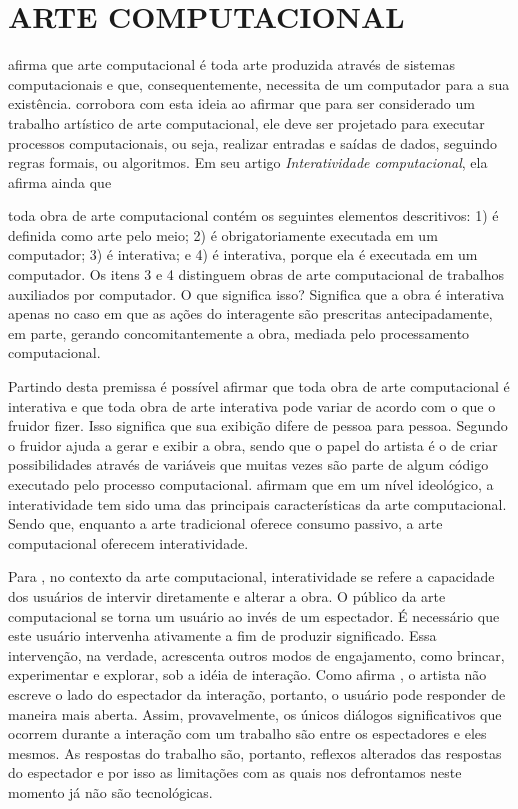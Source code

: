 \section{ARTE COMPUTACIONAL}

 afirma que arte computacional é toda arte produzida através de sistemas  computacionais e que, consequentemente, necessita de um computador para a sua existência.  corrobora com esta ideia ao afirmar que para ser considerado um trabalho artístico de arte computacional, ele deve ser projetado para executar processos computacionais, ou seja, realizar entradas e saídas de dados, seguindo regras formais, ou algoritmos. Em seu artigo \textit{Interatividade computacional}, ela afirma ainda que

\begin{citacao}
toda obra de arte computacional contém os seguintes elementos descritivos: 1) é definida como arte pelo meio; 2) é obrigatoriamente executada em um computador; 3) é interativa; e 4) é interativa, porque ela é executada em um computador. Os itens 3 e 4 distinguem obras de arte computacional de trabalhos auxiliados por computador. O que significa isso? Significa que a obra é interativa apenas no caso em que as ações do interagente são prescritas antecipadamente, em parte, gerando concomitantemente a obra, mediada pelo processamento computacional.  \cite[p. 133]{venturelli}
\end{citacao}

Partindo desta premissa é possível afirmar que toda obra de arte computacional é interativa e que toda obra de arte interativa pode variar de acordo com o que o fruidor fizer. Isso significa que sua exibição difere de pessoa para pessoa. Segundo  o fruidor ajuda a gerar e exibir a obra, sendo que o papel do artista é o de criar possibilidades através de variáveis que muitas vezes são parte de algum código executado pelo processo computacional.  afirmam que em um nível ideológico, a interatividade tem sido uma das principais características da arte computacional. Sendo que, enquanto a arte tradicional oferece consumo passivo, a arte computacional oferecem interatividade.

Para , no contexto da arte computacional, interatividade se refere a capacidade dos usuários de intervir diretamente e alterar a obra. O público da arte computacional se torna um usuário ao invés de um espectador. É necessário que este usuário intervenha ativamente a fim de produzir significado. Essa intervenção, na verdade, acrescenta outros modos de engajamento, como brincar, experimentar e explorar, sob a idéia de interação. Como afirma , o artista não escreve o lado do espectador da interação, portanto, o usuário pode responder de maneira mais aberta. Assim, provavelmente, os únicos diálogos significativos que ocorrem durante a interação com um trabalho são entre os espectadores e eles mesmos. As respostas do trabalho são, portanto, reflexos alterados das respostas do espectador e por isso as limitações com as quais nos defrontamos neste momento já não são tecnológicas.


